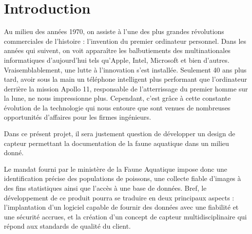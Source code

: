 
%
%

\chapter{Introduction}
\label{s:intro}

Au milieu des années 1970, on assiste à l'une des plus grandes révolutions commerciales de l'histoire : l'invention du premier ordinateur personnel. Dans les années qui suivent, on voit apparaître les balbutiements des multinationales informatiques d'aujourd'hui tels qu'Apple, Intel, Microsoft et bien d'autres. Vraisemblablement, une lutte à l'innovation s'est installée. Seulement 40 ans plus tard, avoir sous la main un téléphone intelligent plus performant que l'ordinateur derrière la mission Apollo 11, responsable de l'atterrissage du premier homme sur la lune, ne nous impressionne plus. Cependant, c'est grâce à cette constante évolution de la technologie qui nous entoure que sont venues de nombreuses opportunités d'affaires pour les firmes ingénieurs.

Dans ce présent projet, il sera justement question de développer un design de capteur permettant la documentation de la faune aquatique dans un milieu donné.

Le mandat fourni par le ministère de la Faune Aquatique impose donc une identification précise des populations de poissons, une collecte fiable d'images à des fins statistiques ainsi que l'accès à une base de données. Bref, le développement de ce produit pourra se traduire en deux principaux aspects : l'implantation d'un logiciel capable de fournir des données avec une fiabilité et une sécurité accrues, et la création d'un concept de capteur multidisciplinaire qui répond aux standards de qualité du client.	




